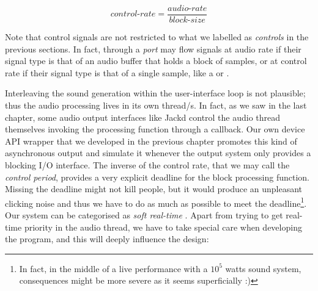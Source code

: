 \begin{equation}
  control\mbox{-}rate = \frac{audio\mbox{-}rate}{block\mbox{-}size}  
\end{equation}

Note that control signals are not restricted to what we labelled as
\emph{controls} in the previous sections. In fact, through a
\emph{port} may flow signals at audio rate if their signal type is
that of an audio buffer that holds a block of samples, or at control
rate if their signal type is that of a single sample, like a
 or .

Interleaving the sound generation within the user-interface loop is
not plausible; thus the audio processing lives in its own thread/s. In
fact, as we saw in the last chapter, some audio output interfaces like
Jackd control the audio thread themselves invoking the processing
function through a callback. Our own device API wrapper that we
developed in the previous chapter promotes this kind of asynchronous
output and simulate it whenever the output system only provides a
blocking I/O interface. The inverse of the control rate, that we may
call the \emph{control period}, provides a very explicit deadline for
the block processing function. Missing the deadline might not kill
people, but it would produce an unpleasant clicking noise and thus we
have to do as much as possible to meet the deadline\footnote{In fact,
  in the middle of a live performance with a $10^5$ watts sound
  system, consequences might be more severe as it seems superficially
  :)}. Our system can be categorised as \emph{soft real-time}
\cite{tanenbaum07mos}. Apart from trying to get real-time priority in
the audio thread, we have to take special care when developing the
program, and this will deeply influence the design:

